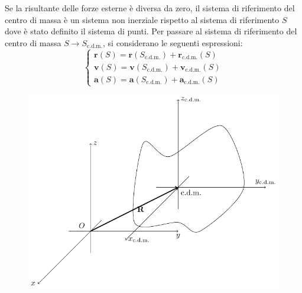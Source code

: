 \documentclass{article}
\newcommand{\vect}[1]{\boldsymbol{\mathbf{#1}}}
\numberwithin{equation}{subsection}
\begin{document}
Se la risultante delle forze esterne è diversa da zero, il sistema di riferimento del centro di massa è un sistema non inerziale rispetto al sistema di riferimento $S$ dove 
è stato definito il sistema di punti. Per passare al sistema di riferimento del centro di massa $S\to S_{\mathrm{c.d.m.}}$, si considerano le seguenti espressioni: 
\begin{equation*}
    \begin{cases}
        \vect{r}(S)=\vect{r}(S_{\mathrm{c.d.m.}})+\vect{r}_{\mathrm{c.d.m.}}(S)\\ 
        \vect{v}(S)=\vect{v}(S_{\mathrm{c.d.m.}})+\vect{v}_{\mathrm{c.d.m.}}(S)\\
        \vect{a}(S)=\vect{a}(S_{\mathrm{c.d.m.}})+\vect{a}_{\mathrm{c.d.m.}}(S)
    \end{cases}
\end{equation*}
\begin{figure}[H]%
    \centering
    \includegraphics{riferimento-cdm.pdf}%
\end{figure}
\end{document}

